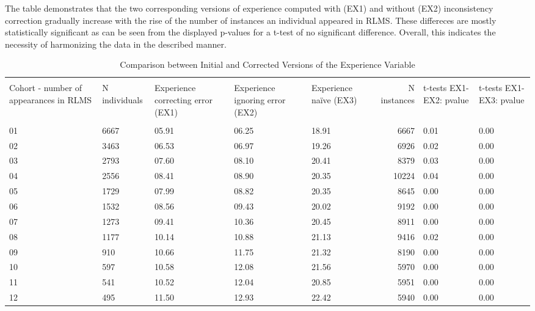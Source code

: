 \documentclass[12pt,a4paper]{article}
\begin{document}
The table demonstrates that the two corresponding versions of experience computed with (EX1) and without (EX2) inconsistency correction gradually increase with the rise of the number of instances an individual appeared in RLMS. These differeces are mostly statistically significant as can be seen from the displayed p-values for a t-test of no significant difference.  Overall, this indicates the necessity of harmonizing the data in the described manner. 
\\





\begin{table}[H]
\footnotesize
\def\arraystretch{1} 
        \centering
        \caption{Comparison between Initial and Corrected Versions of the Experience Variable}
        \label{tab:1}
\begin{tabular}{p{3cm}p{1.5cm}p{1.5cm}p{1.5cm}p{1.5cm}rp{1cm}p{1cm}}
  \hline\hline \\
Cohort - number of  appearances in RLMS & N individuals & Experience correcting error (EX1)  & Experience ignoring error (EX2) & Experience na\"ive (EX3) & N instances & t-tests EX1-EX2: pvalue & t-tests EX1-EX3: pvalue \\ 
  \hline \\
01 & 6667 & 05.91 & 06.25 & 18.91 & 6667 & 0.01 & 0.00 \\ 
    02 & 3463 & 06.53 & 06.97 & 19.26 & 6926 & 0.02 & 0.00 \\ 
    03 & 2793 & 07.60 & 08.10 & 20.41 & 8379 & 0.03 & 0.00 \\ 
    04 & 2556 & 08.41 & 08.90 & 20.35 & 10224 & 0.04 & 0.00 \\ 
    05 & 1729 & 07.99 & 08.82 & 20.35 & 8645 & 0.00 & 0.00 \\ 
    06 & 1532 & 08.56 & 09.43 & 20.02 & 9192 & 0.00 & 0.00 \\ 
    07 & 1273 & 09.41 & 10.36 & 20.45 & 8911 & 0.00 & 0.00 \\ 
    08 & 1177 & 10.14 & 10.88 & 21.13 & 9416 & 0.02 & 0.00 \\ 
    09 & 910 & 10.66 & 11.75 & 21.32 & 8190 & 0.00 & 0.00 \\ 
   10 & 597 & 10.58 & 12.08 & 21.56 & 5970 & 0.00 & 0.00 \\ 
   11 & 541 & 10.52 & 12.04 & 20.85 & 5951 & 0.00 & 0.00 \\ 
   12 & 495 & 11.50 & 12.93 & 22.42 & 5940 & 0.00 & 0.00 \\ 

\end{tabular}
\end{table}
\end{document}
